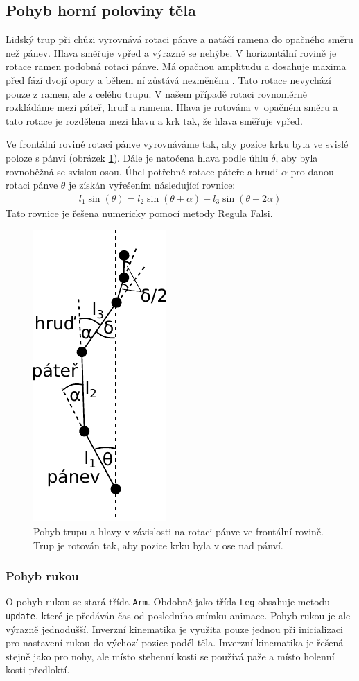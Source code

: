 \subsection{Pohyb horní poloviny těla}
Lidský trup při chůzi vyrovnává rotaci pánve a natáčí ramena do opačného směru než pánev. Hlava směřuje vpřed a výrazně se nehýbe. V horizontální rovině je rotace ramen podobná rotaci pánve. Má opačnou amplitudu a dosahuje maxima před fází dvojí opory a během ní zůstává nezměněna \cite{ceccato2009comparison}. Tato rotace nevychází pouze z ramen, ale z celého trupu. V našem případě rotaci rovnoměrně rozkládáme mezi páteř, hruď a ramena. Hlava je rotována v~opačném směru a tato rotace je rozdělena mezi hlavu a krk tak, že hlava směřuje vpřed.  

Ve frontální rovině rotaci pánve vyrovnáváme tak, aby pozice krku byla ve svislé poloze s pánví (obrázek \ref{fig:vyrovnani_patere}). Dále je natočena hlava podle úhlu $\delta$, aby byla rovnoběžná se svislou osou. Úhel potřebné rotace páteře a hrudi $\alpha$ pro danou rotaci pánve $\theta$ je získán vyřešením následující rovnice:
\begin{eqnarray}
l_1 \sin(\theta) = l_2 \sin(\theta + \alpha) + l_3 \sin(\theta + 2\alpha)
\label{eq:spine_equation}
\end{eqnarray}
Tato rovnice je řešena numericky pomocí metody Regula Falsi.

\begin{figure}[h]
	\centering
	\includegraphics[width=0.17\linewidth]{fig/vyrovnani_patere.pdf}
	\caption{Pohyb trupu a hlavy v závislosti na rotaci pánve ve frontální rovině. Trup je rotován tak, aby pozice krku byla v ose nad pánví.}
	\label{fig:vyrovnani_patere}
\end{figure}

\subsubsection{Pohyb rukou}
O pohyb rukou se stará třída \texttt{Arm}. Obdobně jako třída \texttt{Leg} obsahuje metodu \texttt{update}, které je předáván čas od posledního snímku animace. Pohyb rukou je ale výrazně jednodušší. Inverzní kinematika je využita pouze jednou při inicializaci pro nastavení rukou do výchozí pozice podél těla. Inverzní kinematika je řešená stejně jako pro nohy, ale místo stehenní kosti se používá paže a místo holenní kosti předloktí. 

